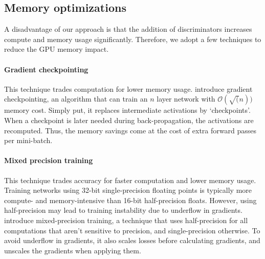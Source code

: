 \subsection{Memory optimizations}\label{sec:mem-opt}
    A disadvantage of our approach is that the addition of discriminators increases compute and memory usage significantly.
    Therefore, we adopt a few techniques to reduce the GPU memory impact.

    \paragraph{Gradient checkpointing}
    This technique trades computation for lower memory usage.
    \citet{grad-ckpt} introduce gradient checkpointing, an algorithm that can train an $n$ layer network with $\mathcal{O}(\sqrt(n))$ memory cost.
    Simply put, it replaces intermediate activations by `checkpoints'.
    When a checkpoint is later needed during back-propagation, the activations are recomputed.
    Thus, the memory savings come at the cost of extra forward passes per mini-batch.

    \paragraph{Mixed precision training}
    This technique trades accuracy for faster computation and lower memory usage.
    Training networks using 32-bit single-precision floating points is typically more compute- and memory-intensive than 16-bit half-precision floats.
    However, using half-precision may lead to training instability due to underflow in gradients.
    \citet{amp} introduce mixed-precision training, a technique that uses half-precision for all computations that aren't sensitive to precision, and single-precision otherwise.
    To avoid underflow in gradients, it also scales losses before calculating gradients, and unscales the gradients when applying them.
